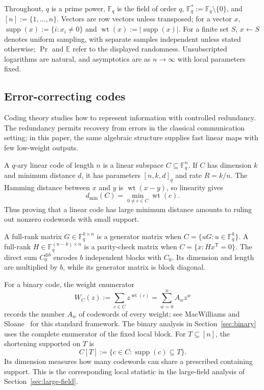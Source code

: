 \documentclass[runningheads,envcountsame,envcountsect]{llncs}
\newcommand{\F}{\mathbb F}
\newcommand{\wt}{\operatorname{wt}}
\newcommand{\supp}{\operatorname{supp}}
\newcommand{\E}{\mathbb E}
\newcommand{\Prb}{\Pr}
\begin{document}
Throughout, $q$ is a prime power, $\F_q$ is the field of order $q$,
$\F_q^\ast:=\F_q\setminus\{0\}$, and $[n]:=\{1,\ldots,n\}$.  Vectors are row
vectors unless transposed; for a vector $x$, $\supp(x):=\{i:x_i\ne0\}$ and
$\wt(x):=|\supp(x)|$.  For a finite set $S$, $x\gets S$ denotes uniform
sampling, with separate samples independent unless stated otherwise; $\Prb$
and $\E$ refer to the displayed randomness.  Unsubscripted logarithms are
natural, and asymptotics are as $n\to\infty$ with local parameters fixed.

\subsection{Error-correcting codes}

Coding theory studies how to represent information with controlled redundancy.
The redundancy permits recovery from errors in the classical communication
setting; in this paper, the same algebraic structure supplies fast linear maps
with few low-weight outputs.

A $q$-ary linear code of length $n$ is a linear subspace
$C\subseteq\F_q^n$.  If $C$ has dimension $k$ and minimum distance $d$, it has
parameters $[n,k,d]_q$ and rate $R=k/n$.  The Hamming distance between $x$ and
$y$ is $\wt(x-y)$, so linearity gives
\[
    d_{\min}(C)=\min_{0\ne c\in C}\wt(c).
\]
Thus proving that a linear code has large minimum distance amounts to ruling
out nonzero codewords with small support.

A full-rank matrix $G\in\F_q^{k\times n}$ is a generator matrix when
$C=\{uG:u\in\F_q^k\}$.  A full-rank
$H\in\F_q^{(n-k)\times n}$ is a parity-check matrix when
$C=\{x:Hx^{\mathsf T}=0\}$.  The direct sum $C_0^{\oplus b}$ encodes $b$
independent blocks with $C_0$.  Its dimension and length are multiplied by
$b$, while its generator matrix is block diagonal.

For a binary code, the weight enumerator
\[
    W_C(z):=\sum_{c\in C}z^{\wt(c)}
           =\sum_{w=0}^n A_w z^w
\]
records the number $A_w$ of codewords of every weight; see
MacWilliams and Sloane~\cite{macwilliams} for this standard framework.
The binary analysis in
Section~\ref{sec:binary} uses the complete enumerator of the fixed local block.
For $T\subseteq[n]$, the shortening supported on $T$ is
\[
    C[T]:=\{c\in C:\supp(c)\subseteq T\}.
\]
Its dimension measures how many codewords can share a prescribed containing
support.  This is the corresponding local statistic in the large-field
analysis of Section~\ref{sec:large-field}.
\end{document}

